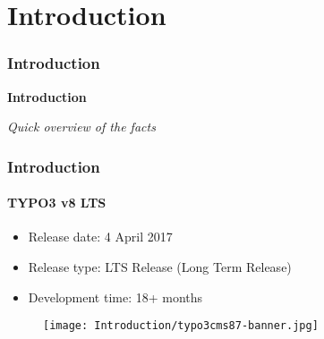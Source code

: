 %

\section{Introduction}
\begin{frame}[fragile]
	\frametitle{Introduction}

	\begin{center}\huge{\color{typo3darkgrey}\textbf{Introduction}}\end{center}
	\begin{center}\large{\textit{Quick overview of the facts}}\end{center}

\end{frame}

\begin{frame}[fragile]
	\frametitle{Introduction}
	\framesubtitle{TYPO3 v8 LTS}

	\begin{itemize}
		\item Release date: 4 April 2017
		\item Release type: LTS Release (Long Term Release)
		\item Development time: 18+ months
	\end{itemize}

	\begin{figure}
		\texttt{[image: Introduction/typo3cms87-banner.jpg]}
	\end{figure}

\end{frame}


